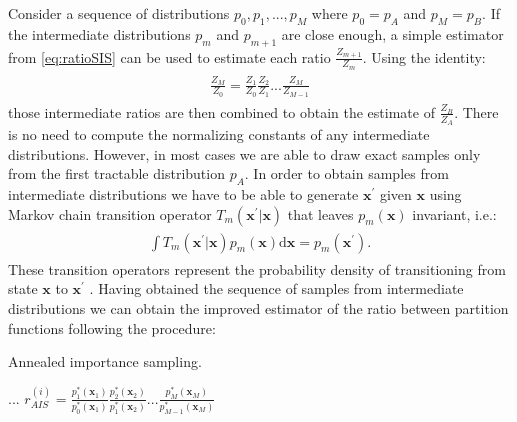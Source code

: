 Consider a sequence of distributions $p_0, p_1, ..., p_M$ where $p_0 = p_A$ and $p_M = p_B$. If the intermediate distributions $p_{m}$ and $p_{m+1}$ are close enough, a simple estimator from \ref{eq:ratioSIS} can be used to estimate each ratio $\frac{Z_{m+1}}{Z_m}$. Using the identity: 
\begin{align}
\begin{split}
\frac{Z_M}{Z_0} = \frac{Z_1}{Z_0}\frac{Z_2}{Z_1}... \frac{Z_M}{Z_{M-1}}
\end{split}
\end{align}
those intermediate ratios are then combined to obtain the estimate of $\frac{Z_B}{Z_A}$. There is no need to compute the normalizing constants of any intermediate distributions. 
However, in most cases we are able to draw exact samples only from the first tractable distribution $p_A$. In order to obtain samples from intermediate distributions we have to be able to generate $\mathbf{x}^{'}$ given $\mathbf{x}$ using Markov chain transition operator $T_m(\mathbf{x}^{'} |\mathbf{x}) $ that leaves $p_m(\mathbf{x})$ invariant, i.e.:
 \begin{align}
\begin{split}
\int T_m(\mathbf{x}^{'} |\mathbf{x}) p_m(\mathbf{x})\text{d}\mathbf{x} = p_m(\mathbf{x}^{'}).
\end{split}
\end{align}
These transition operators represent the probability density of transitioning from state $\mathbf{x}$ to $\mathbf{x}^{'}$ \cite{salakhutdinov2008learning}. Having obtained the sequence of samples from intermediate distributions we can obtain the improved estimator of the ratio between partition functions following the procedure:
\begin{algorithm}[!bthp]
\caption{Annealed importance sampling.}
\label{alg:vae}
\begin{algorithmic}
\State ...
\State $r^{(i)}_{AIS} = \frac{ p^*_1(\mathbf{x}_1) }{ p^*_0(\mathbf{x}_1) }\frac{ p^*_2(\mathbf{x}_2) }{ p^*_1(\mathbf{x}_2) } ... \frac{ p^*_M(\mathbf{x}_M) }{ p^*_{M-1}
(\mathbf{x}_M) }$
\EndFor
\end{algorithmic}
\end{algorithm}

